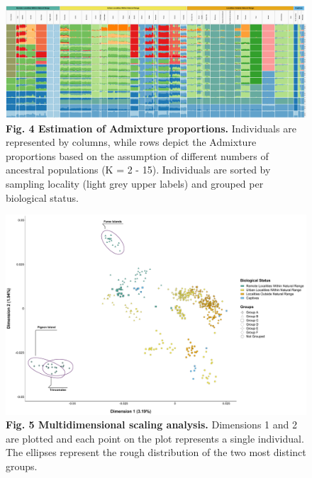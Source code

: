 \documentclass[twoside, british, a4paper]{article}
\begin{document}
\begin{figure}[!ht]
\centering
\includegraphics[width=1\textwidth]{../FPG--Plots/FPG--ngsAdmix/FPG--ngsAdmix_Paired.pdf}
\caption*{ \scriptsize \textbf{Fig. 4 Estimation of Admixture proportions.} Individuals are represented by columns, while rows depict the Admixture proportions based on the assumption of different numbers of ancestral populations (K = 2 - 15). Individuals are sorted by sampling locality (light grey upper labels) and grouped per biological status.}
\label{MainText:FPG--ngsAdmix}
\end{figure}

\begin{figure}[!ht]
\centering
\includegraphics[width=1\textwidth]{../FPG--Plots/FPG--MDS/FPG--MDS_12.pdf}
\caption*{ \scriptsize \textbf{Fig. 5 Multidimensional scaling analysis.} Dimensions 1 and 2 are plotted and each point on the plot represents a single individual. The ellipses represent the rough distribution of the two most distinct groups.}
\label{MainText:FPG--MDS}
\end{figure}


\newpage
\clearpage
\end{document}
